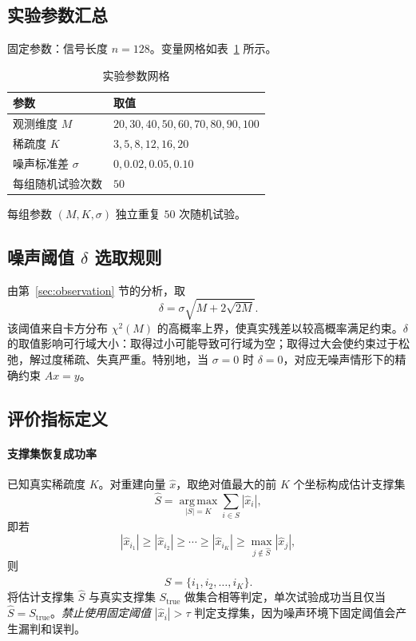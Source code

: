 \documentclass[UTF8]{ctexart}
\numberwithin{figure}{section}
\theoremstyle{definition}
\theoremstyle{examplestyle}
\theoremstyle{remark}
\begin{document}
\subsection{实验参数汇总}
\label{sec:params}

固定参数：信号长度 $n=128$。变量网格如表~\ref{tab:params} 所示。

\begin{table}[htbp]
\centering
\begin{tabular}{ll}
\hline
参数 & 取值 \\
\hline
观测维度 $M$ & $20,30,40,50,60,70,80,90,100$ \\
稀疏度 $K$ & $3,5,8,12,16,20$ \\
噪声标准差 $\sigma$ & $0,0.02,0.05,0.10$ \\
每组随机试验次数 & $50$ \\
\hline
\end{tabular}
\caption{实验参数网格}
\label{tab:params}
\end{table}

每组参数 $(M,K,\sigma)$ 独立重复 $50$ 次随机试验。

\subsection{噪声阈值 $\delta$ 选取规则}
\label{sec:delta-rule}

由第~\ref{sec:observation} 节的分析，取
\begin{equation}
\label{eq:delta-experiment}
\delta=\sigma\sqrt{M+2\sqrt{2M}}.
\end{equation}
该阈值来自卡方分布 $\chi^2(M)$ 的高概率上界，使真实残差以较高概率满足约束。$\delta$ 的取值影响可行域大小：取得过小可能导致可行域为空；取得过大会使约束过于松弛，解过度稀疏、失真严重。特别地，当 $\sigma=0$ 时 $\delta=0$，对应无噪声情形下的精确约束 $Ax=y$。

\subsection{评价指标定义}
\label{sec:metrics}

\paragraph*{支撑集恢复成功率}
已知真实稀疏度 $K$。对重建向量 $\hat{x}$，取绝对值最大的前 $K$ 个坐标构成估计支撑集
\begin{equation}
\label{eq:estimated-support}
\hat{S}=\operatorname*{arg\,max}_{|S|=K}\sum_{i\in S}|\hat{x}_i|,
\end{equation}
即若
\[
|\hat{x}_{i_1}|\ge|\hat{x}_{i_2}|\ge\cdots\ge|\hat{x}_{i_K}|\ge\max_{j\notin\hat{S}}|\hat{x}_j|,
\]
则
\[
\hat{S}=\{i_1,i_2,\dots,i_K\}.
\]
将估计支撑集 $\hat{S}$ 与真实支撑集 $S_{\mathrm{true}}$ 做集合相等判定，单次试验成功当且仅当 $\hat{S}=S_{\mathrm{true}}$。\emph{禁止使用固定阈值} $|\hat{x}_i|>\tau$ 判定支撑集，因为噪声环境下固定阈值会产生漏判和误判。
\end{document}
